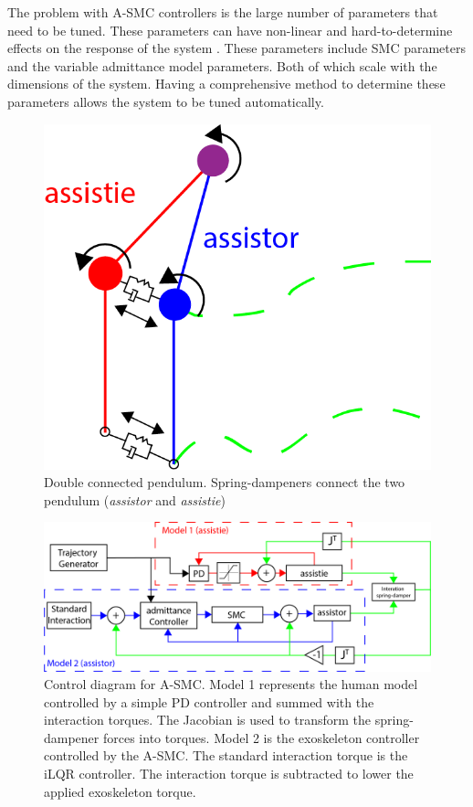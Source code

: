 The problem with A-SMC controllers is the large number of parameters that need to be tuned. These parameters can have non-linear and hard-to-determine effects on the response of the system \cite{slotine1983tracking}. These parameters include SMC parameters and the variable admittance model parameters. Both of which scale with the dimensions of the system. Having a comprehensive method to determine these parameters allows the system to be tuned automatically.  

\begin{figure}
    \centering
    \includegraphics[scale=1.5]{images/controllers/double_pend.png}
    \caption[Double connected pendulum]{Double connected pendulum. Spring-dampeners connect the two pendulum (\textit{assistor} and \textit{assistie}) }
    \label{fig:double_pend}
\end{figure}

\begin{figure}
    \centering
    \includegraphics[width=\linewidth]{images/controllers/SMC_control_diagram_overview.png}
    \caption[Control diagram for A-SMC]{Control diagram for A-SMC. Model 1 represents the human model controlled by a simple PD controller and summed with the interaction torques. The Jacobian is used to transform the spring-dampener forces into torques. Model 2 is the exoskeleton controller controlled by the A-SMC. The standard interaction torque is the iLQR controller. The interaction torque is subtracted to lower the applied exoskeleton torque. }
    \label{fig:controlDiagram}
\end{figure}

